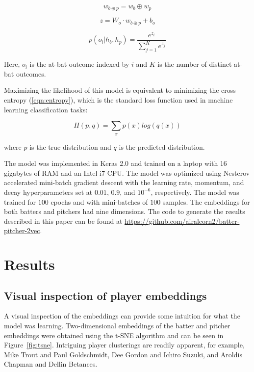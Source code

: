 \documentclass{article}
\begin{document}
\begin{equation}
\label{eqn:concat}
w_{b \oplus p} = w_b \oplus w_p
\end{equation}

\begin{equation}
\label{eqn:output}
z = W_o \cdot w_{b \oplus p} + b_o
\end{equation}

\begin{equation}
\label{eqn:prob}
p(o_i | h_b, h_p) = \frac{e^{z_i}}{\sum_{j=1}^{K} e^{z_j}}
\end{equation}

Here, $o_i$ is the at-bat outcome indexed by $i$ and $K$ is the number of distinct at-bat outcomes.

Maximizing the likelihood of this model is equivalent to minimizing the cross entropy (\ref{eqn:entropy}), which is the standard loss function used in machine learning classification tasks:

\begin{equation}
\label{eqn:entropy}
H(p,q) = \sum_{x} p(x)log(q(x))
\end{equation}

where $p$ is the true distribution and $q$ is the predicted distribution.

The model was implemented in Keras 2.0 \parencite{Keras2015} and trained on a laptop with 16 gigabytes of RAM and an Intel i7 CPU. The model was optimized using Nesterov accelerated mini-batch gradient descent with the learning rate, momentum, and decay hyperparameters set at $0.01$, $0.9$, and $10^{-6}$, respectively. The model was trained for $100$ epochs and with mini-batches of $100$ samples. The embeddings for both batters and pitchers had nine dimensions. The code to generate the results described in this paper can be found at \url{https://github.com/airalcorn2/batter-pitcher-2vec}.

\section{Results}
\label{results}

\subsection{Visual inspection of player embeddings}

A visual inspection of the embeddings can provide some intuition for what the model was learning. Two-dimensional embeddings of the batter and pitcher embeddings were obtained using the t-SNE algorithm \parencite{VanderMaaten2008} and can be seen in Figure~\ref{fig:tsne}. Intriguing player clusterings are readily apparent, for example, Mike Trout and Paul Goldschmidt, Dee Gordon and Ichiro Suzuki, and Aroldis Chapman and Dellin Betances.
\end{document}
